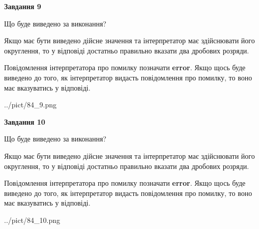 \documentclass[12pt, ukrainian]{article}
\begin{document}
{\begin {Large}
{\begin {center}\textbf{Завдання 9}\end {center}}\par
Що буде виведено за виконання? \par

Якщо має бути виведено дійсне значення та інтерпретатор має здійснювати його округлення, 
то у відповіді достатньо правильно вказати два дробових розряди.

Повідомлення інтерпретатора про помилку позначати \textbf{error}.
Якщо щось буде виведено до того, як інтерпретатор видасть повідомлення про помилку, 
то воно має вказуватись у відповіді. \par

\begin{center}
	{../pict/84_9.png}
\end{center}
\newpage

{\begin {center}\textbf{Завдання 10}\end {center}}\par
Що буде виведено за виконання? \par

Якщо має бути виведено дійсне значення та інтерпретатор має здійснювати його округлення, 
то у відповіді достатньо правильно вказати два дробових розряди.

Повідомлення інтерпретатора про помилку позначати \textbf{error}.
Якщо щось буде виведено до того, як інтерпретатор видасть повідомлення про помилку, 
то воно має вказуватись у відповіді. \par

\begin{center}
	{../pict/84_10.png}
\end{center}
\newpage

\end {Large}}
\end{document}
